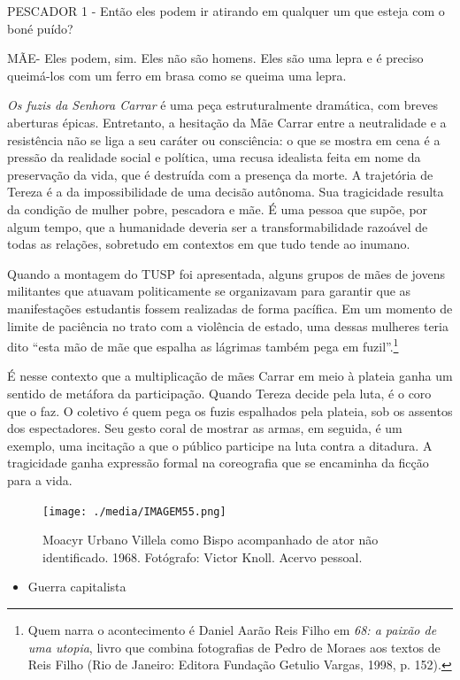 PESCADOR 1 - Então eles podem ir atirando em qualquer um que esteja com
o boné puído?

MÃE- Eles podem, sim. Eles não são homens. Eles são uma lepra e é
preciso queimá-los com um ferro em brasa como se queima uma lepra.

\textit{Os fuzis da Senhora Carrar} é uma peça estruturalmente dramática,
com breves aberturas épicas. Entretanto, a hesitação da Mãe Carrar entre
a neutralidade e a resistência não se liga a seu caráter ou consciência:
o que se mostra em cena é a pressão da realidade social e política, uma
recusa idealista feita em nome da preservação da vida, que é destruída
com a presença da morte. A trajetória de Tereza é a da impossibilidade
de uma decisão autônoma. Sua tragicidade resulta da condição de mulher
pobre, pescadora e mãe. É uma pessoa que supõe, por algum tempo, que a
humanidade deveria ser a transformabilidade razoável de todas as
relações, sobretudo em contextos em que tudo tende ao inumano.

Quando a montagem do TUSP foi apresentada, alguns grupos de mães de
jovens militantes que atuavam politicamente se organizavam para garantir
que as manifestações estudantis fossem realizadas de forma pacífica. Em
um momento de limite de paciência no trato com a violência de estado,
uma dessas mulheres teria dito “esta mão de mãe que espalha as lágrimas
também pega em fuzil”.\footnote{Quem narra o acontecimento é Daniel
  Aarão Reis Filho em \textit{68: a paixão de uma utopia}, livro que
  combina fotografias de Pedro de Moraes aos textos de Reis Filho (Rio
  de Janeiro: Editora Fundação Getulio Vargas, 1998, p. 152).}

É nesse contexto que a multiplicação de mães Carrar em meio à plateia
ganha um sentido de metáfora da participação. Quando Tereza decide pela
luta, é o coro que o faz. O coletivo é quem pega os fuzis espalhados
pela plateia, sob os assentos dos espectadores. Seu gesto coral de
mostrar as armas, em seguida, é um exemplo, uma incitação a que o
público participe na luta contra a ditadura. A tragicidade ganha
expressão formal na coreografia que se encaminha da ficção para a vida.

\begin{figure}
\texttt{[image: ./media/IMAGEM55.png]}
\caption{Moacyr Urbano Villela como Bispo acompanhado de ator não identificado.
1968. Fotógrafo: Victor Knoll. Acervo pessoal.}
\end{figure}

\begin{itemize}
\item
  Guerra capitalista
\end{itemize}

